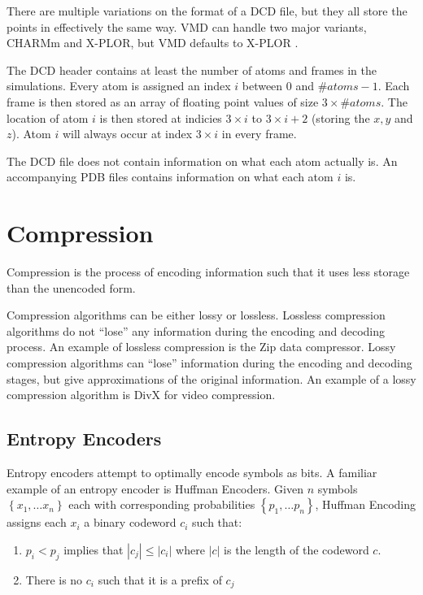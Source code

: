 \documentclass[a4paper]{report}
\begin{document}
There are multiple variations on the format of a DCD file, but they all store
the points in effectively the same way. VMD can handle two major variants,
CHARMm and X-PLOR, but VMD defaults to X-PLOR \citep{vmddcdformat}.

The DCD header contains at least the number of atoms and frames in the
simulations. Every atom is assigned an index $i$ between $0$ and $\#atoms -
1$. Each frame is then stored as an array of floating point values of size $3
\times \#atoms$. The location of atom $i$ is then stored at indicies $3 \times
i$ to $3 \times i + 2$ (storing the $x, y$ and $z$). Atom $i$ will always
occur at index $3 \times i$ in every frame.

The DCD file does not contain information on what each atom actually is. An
accompanying PDB files contains information on what each atom $i$ is.


\section{Compression}

Compression is the process of encoding information such that it uses less
storage than the unencoded form.

Compression algorithms can be either lossy or lossless. Lossless compression
algorithms do not ``lose'' any information during the encoding and decoding
process. An example of lossless compression is the Zip data compressor. Lossy
compression algorithms can ``lose'' information during the encoding and
decoding stages, but give approximations of the original information. An
example of a lossy compression algorithm is DivX for video compression.

\subsection{Entropy Encoders}

Entropy encoders attempt to optimally encode symbols as bits. A familiar
example of an entropy encoder is Huffman Encoders. Given $n$ symbols
$\left\{x_1, \dots x_n \right\}$ each with corresponding probabilities
$\left\{p_1, \dots p_n \right\}$, Huffman Encoding assigns each $x_i$ a binary
codeword $c_i$ such that:
\begin{enumerate}
  \item $p_i < p_j$ implies that $|c_j| \le |c_i|$ where $|c|$ is the length
    of the codeword $c$.
  \item There is no $c_i$ such that it is a prefix of $c_j$
\end{enumerate}
\citep{huffman1952method}
\end{document}
